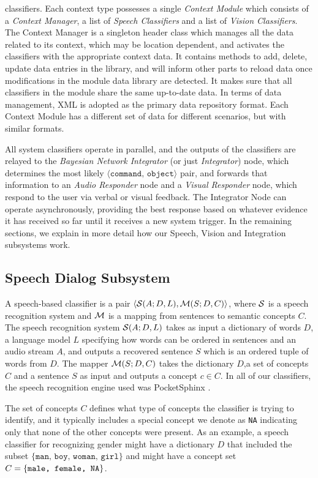 \documentclass{llncs}
\begin{document}
classifiers.  Each context type possesses a single {\em Context
  Module} which consists of a {\em Context Manager}, a list of {\em
  Speech Classifiers} and a list of {\em Vision Classifiers}.  The
Context Manager is a singleton header class which manages all the data
related to its context, which may be location dependent, and activates
the classifiers with the appropriate context data.  It contains
methods to add, delete, update data entries in the library, and will
inform other parts to reload data once modifications in the module
data library are detected. It makes sure that all classifiers in the
module share the same up-to-date data. In terms of data management, XML
is adopted as the primary data repository format. Each Context Module
has a different set of data for different scenarios, but with similar
formats.

All system classifiers operate in parallel, and the outputs of the classifiers are relayed to the {\em Bayesian Network Integrator} (or just {\em Integrator}) node, which determines the most likely $\langle \texttt{command, object}\rangle$ pair, and forwards that information to an {\em Audio Responder} node and a {\em Visual Responder} node, which respond to the user via verbal or visual feedback.  The Integrator Node can operate asynchronously, providing the best response based on whatever evidence it has received so far until it receives a new system trigger. In the remaining sections, we explain in more detail how our Speech, Vision and Integration subsystems work.

\subsection{Speech Dialog Subsystem}
A speech-based classifier is a pair
$\langle{\cal{S}}(A;D,L),{\cal{M}}(S;D,C)\rangle$, where $\cal{S}$ is a
speech recognition system and $\cal{M}$ is a mapping from sentences to
semantic concepts $C$.  The speech recognition system ${\cal{S}}(A;D,L)$
takes as input a dictionary of words $D$, a language model $L$
specifying how words can be ordered in sentences and an audio stream
$A$, and outputs a recovered sentence $S$ which is an ordered tuple of
words from $D$. The mapper ${\cal{M}}(S;D,C)$ takes the dictionary $D$,a
set of concepts $C$ and a sentence $S$ as input and outputs a concept
$c\in C$.  In all of our classifiers, the speech recognition engine used was
PocketSphinx \citep{pocketsphinx}.

The set of concepts $C$ defines what type of concepts the classifier
is trying to identify, and it typically includes a special concept we
denote as \texttt{NA} indicating only that none of the other concepts
were present. As an example, a speech classifier for recognizing
gender might have a dictionary $D$ that included the subset
$\{\texttt{man, boy, woman, girl}\}$ and might have a concept set
$C=\{\texttt{male, female,\mbox{ NA}}\}$.
\end{document}
